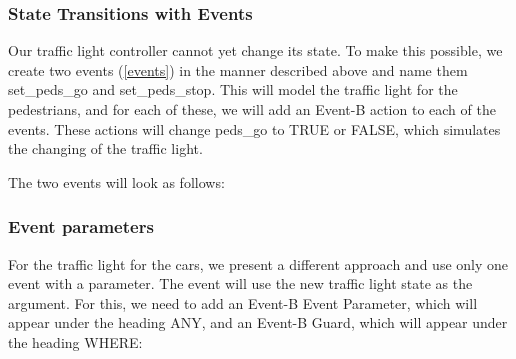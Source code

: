 \subsubsection{State Transitions with Events}

Our traffic light controller cannot yet change its state.  To make this possible, we create two events (\ref{events}) in the manner described above and name them \textsf{set\_peds\_go} and \textsf{set\_peds\_stop}. This will model the traffic light for the pedestrians, and for each of these, we will add an Event-B action to each of the events. These actions will change \textsf{peds\_go} to \textsf{TRUE} or \textsf{FALSE}, which simulates the changing of the traffic light.


The two events will look as follows:


\subsubsection{Event parameters}

For the traffic light for the cars, we present a different approach and use only one event with a parameter.  The event will use the new traffic light state as the argument. For this, we need to add an Event-B Event Parameter, which will appear under the heading \textsf{ANY}, and an Event-B Guard, which will appear under the heading \textsf{WHERE}: 


